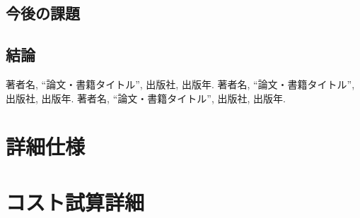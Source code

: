 \documentclass[12pt,a4paper]{jsarticle}
\begin{document}
\subsection{今後の課題}

\subsection{結論}

\begin{thebibliography}{9}
 著者名, ``論文・書籍タイトル'', 出版社, 出版年.
 著者名, ``論文・書籍タイトル'', 出版社, 出版年.
 著者名, ``論文・書籍タイトル'', 出版社, 出版年.
\end{thebibliography}

\appendix
\section{詳細仕様}

\section{コスト試算詳細}
\end{document}
